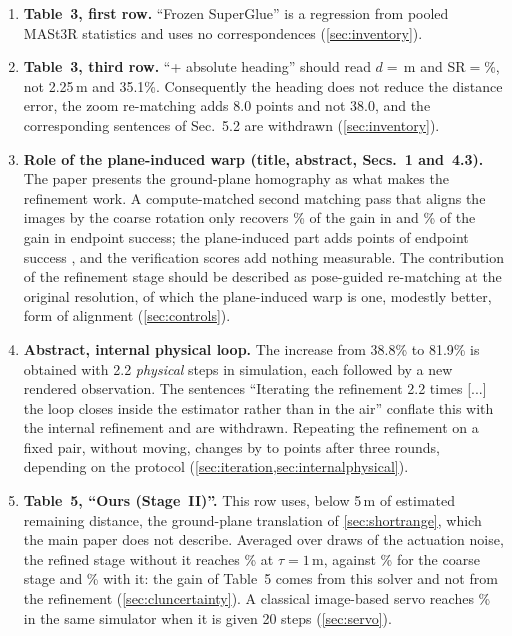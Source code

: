 \begin{enumerate}[leftmargin=*,itemsep=2pt,topsep=3pt]
\item \textbf{Table~3, first row.} ``Frozen SuperGlue'' is a regression from pooled MASt3R statistics and uses no correspondences (\cref{sec:inventory}).
\item \textbf{Table~3, third row.} ``+ absolute heading'' should read $d{=}$\fOneD\,m and SR${=}$\fOneSRd\%, not 2.25\,m and 35.1\%. Consequently the heading does not reduce the distance error, the zoom re-matching adds 8.0 points and not 38.0, and the corresponding sentences of Sec.~5.2 are withdrawn (\cref{sec:inventory}).
\item \textbf{Role of the plane-induced warp (title, abstract, Secs.~1 and~4.3).} The paper presents the ground-plane homography as what makes the refinement work. A compute-matched second matching pass that aligns the images by the coarse rotation only recovers \ctRotShareD\% of the gain in \SRd{} and \ctRotShareE\% of the gain in endpoint success; the plane-induced part adds \ctPlaneGainSRe{} points of endpoint success \ci{\ctPlaneGainSReLo}{\ctPlaneGainSReHi}, and the verification scores add nothing measurable. The contribution of the refinement stage should be described as pose-guided re-matching at the original resolution, of which the plane-induced warp is one, modestly better, form of alignment (\cref{sec:controls}).
\item \textbf{Abstract, internal \vs physical loop.} The increase from 38.8\% to 81.9\% is obtained with 2.2 \emph{physical} steps in simulation, each followed by a new rendered observation. The sentences ``Iterating the refinement 2.2 times [...] the loop closes inside the estimator rather than in the air'' conflate this with the internal refinement and are withdrawn. Repeating the refinement on a fixed pair, without moving, changes \SRe{} by \itThreeASRe{} \ci{\itThreeASReLo}{\itThreeASReHi} to \itThreeBSRe{} \ci{\itThreeBSReLo}{\itThreeBSReHi} points after three rounds, depending on the protocol (\cref{sec:iteration,sec:internalphysical}).
\item \textbf{Table~5, ``Ours (Stage~II)''.} This row uses, below 5\,m of estimated remaining distance, the ground-plane translation of \cref{sec:shortrange}, which the main paper does not describe. Averaged over \clSeeds{} draws of the actuation noise, the refined stage without it reaches \clSiiPlainSR\% at $\tau{=}1$\,m, against \clSiSR\% for the coarse stage and \clSiiSR\% with it: the gain of Table~5 comes from this solver and not from the refinement (\cref{sec:cluncertainty}). A classical image-based servo reaches \svIbvsFinal\% in the same simulator when it is given 20 steps (\cref{sec:servo}).

\end{enumerate}
